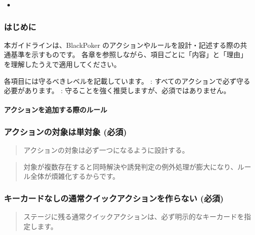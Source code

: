 \documentclass[letterpaper,10pt,dvipdfmx]{sphinxmanual}
\begin{document}
\begin{sphinxShadowBox}
\begin{itemize}
\begin{itemize}
\end{itemize}

\item {} 
\sphinxAtStartPar
{}\label{\detokenize{appendix/guideline/customRule:id19}}{\hyperref[\detokenize{appendix/guideline/customRule:id10}]{}}

\end{itemize}
\end{sphinxShadowBox}


\subsubsection{はじめに}
\label{\detokenize{appendix/guideline/customRule:id2}}
\sphinxAtStartPar
本ガイドラインは、BlackPoker のアクションやルールを設計・記述する際の共通基準を示すものです。
各章を参照しながら、項目ごとに「内容」と「理由」を理解したうえで適用してください。

\sphinxAtStartPar
各項目には守るべきレベルを記載しています。
\sphinxhyphen{} : すべてのアクションで必ず守る必要があります。
\sphinxhyphen{} : 守ることを強く推奨しますが、必須ではありません。


\paragraph{アクションを追加する際のルール}
\label{\detokenize{appendix/guideline/customRule:id3}}

\subsubsection{アクションの対象は単対象 (必須)}
\label{\detokenize{appendix/guideline/customRule:id4}}
\sphinxAtStartPar
{}
\begin{quote}

\sphinxAtStartPar
アクションの対象は必ず一つになるように設計する。
\end{quote}

\sphinxAtStartPar
{}
\begin{quote}

\sphinxAtStartPar
対象が複数存在すると同時解決や誘発判定の例外処理が膨大になり、ルール全体が煩雑化するからです。
\end{quote}


\subsubsection{キーカードなしの通常\sphinxhyphen{}クイックアクションを作らない (必須)}
\label{\detokenize{appendix/guideline/customRule:id5}}
\sphinxAtStartPar
{}
\begin{quote}

\sphinxAtStartPar
ステージに残る通常\sphinxhyphen{}クイックアクションは、必ず明示的なキーカードを指定します。
\end{quote}
\end{document}
